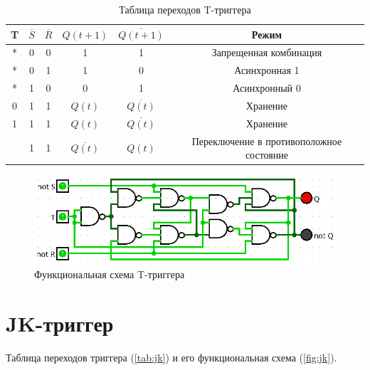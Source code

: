\documentclass[14pt, a4paper]{extreport}
\newcommand\clockbt{%
	\begin{tikzpicture}[scale=0.25pt]
		\draw (0,0) -- (1,0) -- (1,1) -- (2,1);
	\end{tikzpicture}%
}
\begin{document}
\begin{table}[H]
	\caption{Таблица переходов T-триггера}
	\label{tab:t-on-dual-rs}
	\begin{tabular}{|c|c|c|c|c|c|}
		\hline
		T & $\overline{S}$ & $\overline{R}$ & $Q(t + 1)$ & $\overline{Q(t + 1)}$ & Режим \\
		\hline
		* & 0 & 0 & 1 & 1 & Запрещенная комбинация \\
		\hline
		* & 0 & 1 & 1 & 0 & Асинхронная 1 \\
		\hline
		* & 1 & 0 & 0 & 1 & Асинхронный 0 \\
		\hline
		0 & 1 & 1 & $Q(t)$ & $\overline{Q(t)}$ & Хранение \\
		\hline
		1 & 1 & 1 & $Q(t)$ & $\overline{Q(t)}$ & Хранение \\
		\hline
		\clockbt & 1 & 1 & $\overline{Q(t)}$ & $Q(t)$ & Переключение в противоположное состояние \\
		\hline
	\end{tabular}
\end{table}

\begin{figure}[H]
	\caption{Функциональная схема T-триггера}
	\label{fig:t-on-dual-rs}
	\includegraphics[width=\textwidth]{t-on-dual-rs}
\end{figure}

\section{JK-триггер}
Таблица переходов триггера (\cref{tab:jk}) и его функциональная схема (\cref{fig:jk}).
\end{document}
